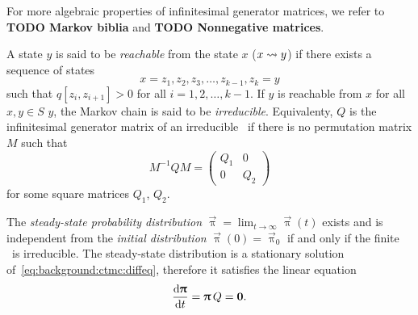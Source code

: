 For more algebraic properties of infinitesimal generator matrices, we
refer to \textbf{TODO Markov biblia} and \textbf{TODO Nonnegative
  matrices}.

A state $y$ is said to be \emph{reachable} from the state $x$
($x \leadsto y$) if there exists a sequence of states
\begin{equation}
  x = z_1, z_2, z_3, \ldots, z_{k - 1}, z_k = y
\end{equation}
such that $q[z_i, z_{i + 1}] > 0$ for all $i = 1, 2, \ldots, k -
1$.
If $y$ is reachable from $x$ for all $x, y \in S$ $y$, the Markov chain
is said to be \emph{irreducible}. Equivalenty, $Q$ is the
infinitesimal generator matrix of an irreducible \CTMC\ if there is no
permutation matrix $M$ such that
\begin{equation}
  M^{-1} Q M =
  \begin{pmatrix}
    Q_1 & 0 \\
    0 & Q_2
  \end{pmatrix}
\end{equation}
for some square matrices $Q_1$, $Q_2$.

The \emph{steady-state probability distribution}
$\vec{\uppi} = \lim_{t \to \infty} \vec{\uppi}(t)$ exists and is
independent from the \emph{initial distribution}
$\vec{\uppi}(0) = \vec{\uppi}_0$ if and only if the finite \CTMC\ is
irreducible. The steady-state distribution is a stationary solution
of~\cref{eq:background:ctmc:diffeq}, therefore it satisfies the linear
equation
\begin{equation}
  \label{eq:background:ctmc:steadystate}
  \frac{\mathrm{d} \bm{\mathrm{\uppi}}}{\mathrm{d} t} = \bm{\mathrm{\uppi}} \, Q = \bm{\mathrm{0}}
  \text.
\end{equation}

